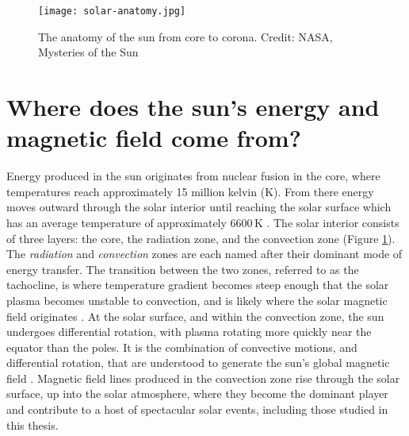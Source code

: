 \begin{figure}
	\texttt{[image: solar-anatomy.jpg]}
	\caption{The anatomy of the sun from core to corona. Credit: NASA, Mysteries of the Sun}
	\label{fig:anatomy}
\end{figure} 
 

\section{Where does the sun's energy and magnetic field come from?} 
Energy produced in the sun originates from nuclear fusion in the core, where temperatures reach approximately 15 million kelvin (K).
From there energy moves outward through the solar interior until reaching the solar surface which has an average temperature of approximately 6600\,K  \citep{SolarPhysicsOverview}. 
The solar interior consists of three layers: the core, the radiation zone, and the convection zone (Figure \ref{fig:anatomy}).
The \emph{radiation} and \emph{convection} zones are each named after their dominant mode of energy transfer.
The transition between the two zones, referred to as the tachocline, is where temperature gradient becomes steep enough that the solar plasma becomes unstable to convection, and is likely where the solar magnetic field originates \citep{SolarPhysicsOverview}.
At the solar surface, and within the convection zone, the sun undergoes differential rotation, with plasma rotating more quickly near the equator than the poles.
It is the combination of convective motions, and differential rotation, that are understood to generate the sun's global magnetic field \citep{Parker1979,Priest2014,JudgeBook}.
Magnetic field lines produced in the convection zone rise through the solar surface, up into the solar atmosphere, where they become the dominant player and contribute to a host of spectacular solar events, including those studied in this thesis.



